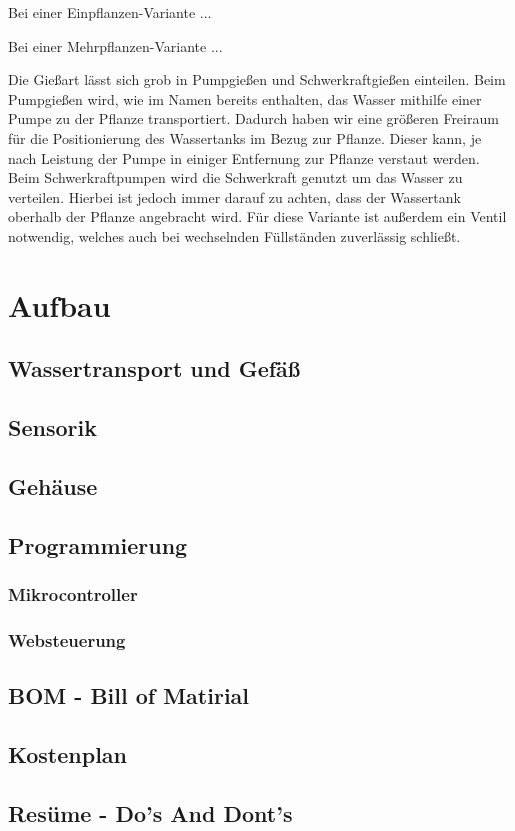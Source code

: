 \documentclass[]{IEEEtran}
\begin{document}
Bei einer Einpflanzen-Variante ...

Bei einer Mehrpflanzen-Variante ...

Die Gießart lässt sich grob in Pumpgießen und Schwerkraftgießen einteilen. Beim Pumpgießen wird, wie im Namen bereits enthalten, das Wasser mithilfe einer Pumpe zu der Pflanze transportiert. Dadurch haben wir eine größeren Freiraum für die Positionierung des Wassertanks im Bezug zur Pflanze. Dieser kann, je nach Leistung der Pumpe in einiger Entfernung zur Pflanze verstaut werden. 
Beim Schwerkraftpumpen wird die Schwerkraft genutzt um das Wasser zu verteilen. Hierbei ist jedoch immer darauf zu achten, dass der Wassertank oberhalb der Pflanze angebracht wird. Für diese Variante ist außerdem ein Ventil notwendig, welches auch bei wechselnden Füllständen zuverlässig schließt.


\section{Aufbau}

	\subsection{Wassertransport und Gefäß}
	
	\subsection{Sensorik}
	
	\subsection{Gehäuse}

	\subsection{Programmierung}
		
		\subsubsection{Mikrocontroller}
	
		\subsubsection{Websteuerung}
	
	\subsection{BOM - Bill of Matirial}
	
	\subsection{Kostenplan}
	
	\subsection{Resüme - Do's And Dont's}	
	
\end{document}
